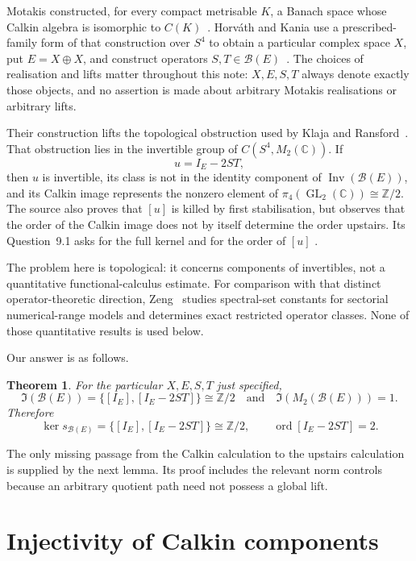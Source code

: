 \documentclass[11pt]{article}
\newtheorem{theorem}{Theorem}
\theoremstyle{remark}
\newcommand{\B}{\mathcal B}
\newcommand{\Inv}{\operatorname{Inv}}
\newcommand{\GL}{\operatorname{GL}}
\newcommand{\Id}{\mathfrak I}
\begin{document}
Motakis constructed, for every compact metrisable $K$, a Banach space whose
Calkin algebra is isomorphic to $C(K)$~\cite{Motakis2024}.  Horv\'ath and
Kania use a prescribed-family form of that construction over $S^4$ to obtain a
particular complex space $X$, put $E=X\oplus X$, and construct operators
$S,T\in\B(E)$~\cite[Theorems~4.1 and~5.1]{HorvathKania2026}.  The choices of
realisation and lifts matter throughout this note: $X,E,S,T$ always denote
exactly those objects, and no assertion is made about arbitrary Motakis
realisations or arbitrary lifts.

Their construction lifts the topological obstruction used by Klaja and
Ransford~\cite{KlajaRansford2017}.  That obstruction lies in the invertible
group of $C(S^4,M_2(\mathbb C))$.  If
\[
  u=I_E-2ST,
\]
then $u$ is invertible, its class is not in the identity component of
$\Inv(\B(E))$, and its Calkin image represents the nonzero element of
$\pi_4(\GL_2(\mathbb C))\cong\mathbb Z/2$.  The source also proves that
$[u]$ is killed by first stabilisation, but observes that the order of the
Calkin image does not by itself determine the order upstairs.  Its
Question~9.1 asks for the full kernel and for the order of $[u]$
\cite[pp.~23 and~26]{HorvathKania2026}.

The problem here is topological: it concerns components of invertibles, not a
quantitative functional-calculus estimate.  For comparison with that distinct
operator-theoretic direction, Zeng~\cite{Zeng2026Lens} studies spectral-set
constants for sectorial numerical-range models and determines exact restricted
operator classes.  None of those quantitative results is used below.

Our answer is as follows.

\begin{theorem}\label{thm:main}
For the particular $X,E,S,T$ just specified,
\[
  \Id(\B(E))=\{[I_E],[I_E-2ST]\}\cong\mathbb Z/2
  \quad\text{and}\quad
  \Id(M_2(\B(E)))=1.
\]
Therefore
\[
 \ker s_{\B(E)}
   =\{[I_E],[I_E-2ST]\}\cong\mathbb Z/2,
 \qquad
 \operatorname{ord}[I_E-2ST]=2.
\]
\end{theorem}

The only missing passage from the Calkin calculation to the upstairs
calculation is supplied by the next lemma.  Its proof includes the relevant
norm controls because an arbitrary quotient path need not possess a global
lift.

\section{Injectivity of Calkin components}
\end{document}
